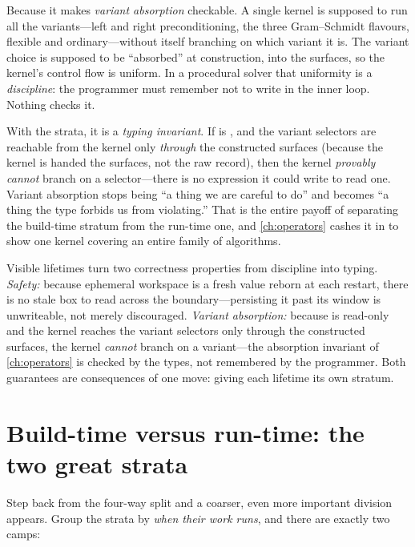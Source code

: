 Because it makes \emph{variant absorption} checkable. A single kernel is supposed
to run all the variants---left and right preconditioning, the three
Gram--Schmidt flavours, flexible and ordinary---without itself branching on which
variant it is. The variant choice is supposed to be ``absorbed'' at construction,
into the surfaces, so the kernel's control flow is uniform. In a procedural
solver that uniformity is a \emph{discipline}: the programmer must remember not
to write  in the inner loop. Nothing checks it.

With the strata, it is a \emph{typing invariant}. If  is
, and the variant selectors are reachable from the kernel only
\emph{through} the constructed surfaces (because the kernel is handed the
surfaces, not the raw record), then the kernel \emph{provably cannot} branch on a
selector---there is no expression it could write to read one. Variant absorption
stops being ``a thing we are careful to do'' and becomes ``a thing the type
forbids us from violating.'' That is the entire payoff of separating the
build-time stratum from the run-time one, and \cref{ch:operators} cashes it in to
show one kernel covering an entire family of algorithms.

\begin{keyidea}
Visible lifetimes turn two correctness properties from discipline into typing.
\emph{Safety:} because ephemeral workspace is a fresh value reborn at each
restart, there is no stale box to read across the boundary---persisting it past
its window is unwriteable, not merely discouraged. \emph{Variant absorption:}
because  is read-only and the kernel reaches the variant selectors
only through the constructed surfaces, the kernel \emph{cannot} branch on a
variant---the absorption invariant of \cref{ch:operators} is checked by the
types, not remembered by the programmer. Both guarantees are consequences of one
move: giving each lifetime its own stratum.
\end{keyidea}

\section{Build-time versus run-time: the two great strata}

Step back from the four-way split and a coarser, even more important division
appears. Group the strata by \emph{when their work runs}, and there are exactly
two camps:

